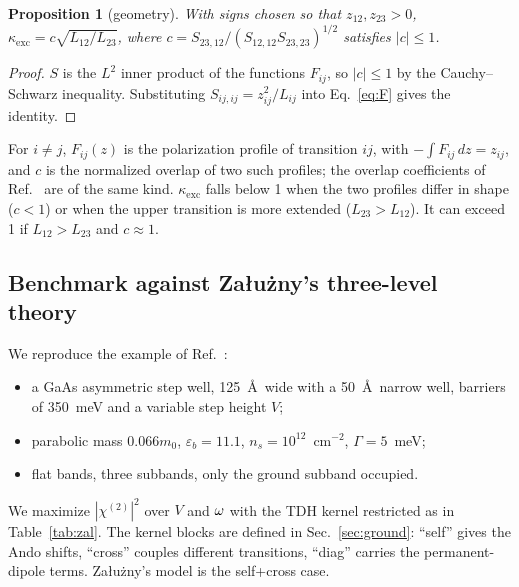 \documentclass[11pt]{article}
\newcommand{\chitwo}{\chi^{(2)}}
\let\hbar\relax\DeclareRobustCommand{\hbar}{{\mathchar'26\mkern-9mu h}}
\newtheorem{proposition}{Proposition}
\begin{document}
\begin{proposition}[geometry]\label{prop:geom}
With signs chosen so that $z_{12},z_{23}>0$, $\kappa_\mathrm{exc}=c\sqrt{L_{12}/L_{23}}$, where $c=S_{23,12}/(S_{12,12}S_{23,23})^{1/2}$ satisfies $|c|\le1$.
\end{proposition}
\begin{proof}
$S$ is the $L^2$ inner product of the functions $F_{ij}$, so $|c|\le1$ by the Cauchy--Schwarz inequality. Substituting $S_{ij,ij}=z_{ij}^2/L_{ij}$ into Eq.~\eqref{eq:F} gives the identity.
\end{proof}
For $i\ne j$, $F_{ij}(z)$ is the polarization profile of transition $ij$, with $-\int F_{ij}\,dz=z_{ij}$, and $c$ is the normalized overlap of two such profiles; the overlap coefficients of Ref.~\cite{Krieguer2024} are of the same kind. $\kappa_\mathrm{exc}$ falls below 1 when the two profiles differ in shape ($c<1$) or when the upper transition is more extended ($L_{23}>L_{12}$). It can exceed 1 if $L_{12}>L_{23}$ and $c\approx1$.

\subsection{Benchmark against Załużny's three-level theory}\label{sec:bench}
We reproduce the example of Ref.~\cite{Zaluzny1995}:
\begin{itemize}
\item a GaAs asymmetric step well, 125~\AA\ wide with a 50~\AA\ narrow well, barriers of 350~meV and a variable step height $V$;
\item parabolic mass $0.066m_0$, $\varepsilon_b=11.1$, $n_s=10^{12}$~cm$^{-2}$, $\Gamma=5$~meV;
\item flat bands, three subbands, only the ground subband occupied.
\end{itemize}
We maximize $|\chitwo|^2$ over $V$ and $\hbar\omega$ with the TDH kernel restricted as in Table~\ref{tab:zal}. The kernel blocks are defined in Sec.~\ref{sec:ground}: ``self'' gives the Ando shifts, ``cross'' couples different transitions, ``diag'' carries the permanent-dipole terms. Załużny's model is the self+cross case.
\end{document}
